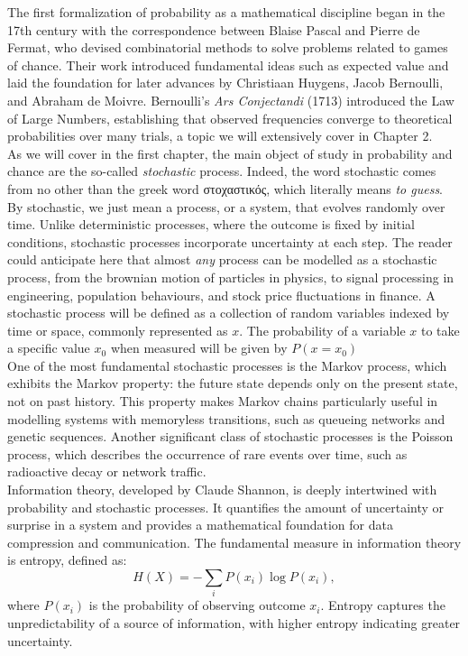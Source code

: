 \documentclass{book}
\begin{document}
The first formalization of probability as a mathematical discipline began in the 17th century with the correspondence between Blaise Pascal and Pierre de Fermat, who devised combinatorial methods to solve problems related to games of chance. Their work introduced fundamental ideas such as expected value and laid the foundation for later advances by Christiaan Huygens, Jacob Bernoulli, and Abraham de Moivre. Bernoulli’s \textit{Ars Conjectandi} (1713) introduced the Law of Large Numbers, establishing that observed frequencies converge to theoretical probabilities over many trials, a topic we will extensively cover in Chapter 2.\\

As we will cover in the first chapter, the main object of study in probability and chance are the so-called \textit{stochastic} process. Indeed, the word stochastic comes from no other than the greek word \textgreek{στοχαστικός}, which literally means \textit{to guess}. By stochastic, we just mean a process, or a system, that evolves randomly over time. Unlike deterministic processes, where the outcome is fixed by initial conditions, stochastic processes incorporate uncertainty at each step. The reader could anticipate here that almost \textit{any} process can be modelled as a stochastic process, from the brownian motion of particles in physics, to signal processing in engineering, population behaviours, and stock price fluctuations in finance. A stochastic process will be defined as a collection of random variables indexed by time or space, commonly represented as $x$. The probability of a variable $x$ to take a specific value $x_{0}$ when measured will be given by $P(x = x_{0})$\\

One of the most fundamental stochastic processes is the Markov process, which exhibits the Markov property: the future state depends only on the present state, not on past history. This property makes Markov chains particularly useful in modelling systems with memoryless transitions, such as queueing networks and genetic sequences. Another significant class of stochastic processes is the Poisson process, which describes the occurrence of rare events over time, such as radioactive decay or network traffic.\\

Information theory, developed by Claude Shannon, is deeply intertwined with probability and stochastic processes. It quantifies the amount of uncertainty or surprise in a system and provides a mathematical foundation for data compression and communication. The fundamental measure in information theory is entropy, defined as:
\begin{equation}
    H(X) = -\sum_{i} P(x_i) \log P(x_i),
\end{equation}
where $P(x_i)$ is the probability of observing outcome $x_i$. Entropy captures the unpredictability of a source of information, with higher entropy indicating greater uncertainty.\\
\end{document}
